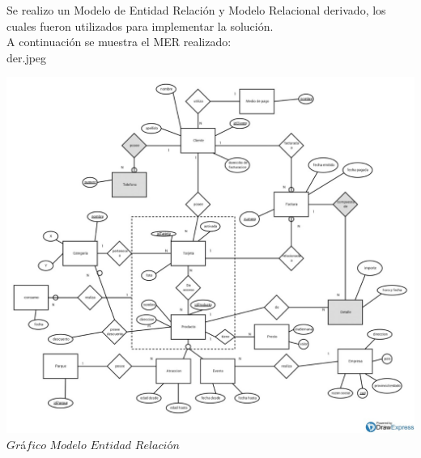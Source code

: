 Se realizo un Modelo de Entidad Relación y Modelo Relacional derivado, los cuales fueron utilizados para implementar la solución. \\

A continuación se muestra el MER realizado:\\

der.jpeg

\vspace*{0.3cm} \vspace*{0.3cm}
  \begin{center}
 \includegraphics[scale=0.43]{der.jpeg}
 {$Gr$\'a$fico$ $Modelo$ $Entidad$ $Relaci$\'o$n$}
  \end{center}
  \vspace*{0.3cm}
  
  
